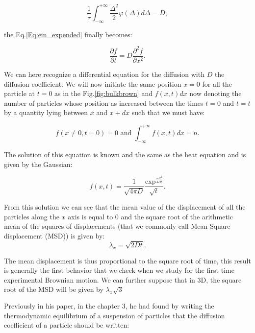\begin{equation}
	\frac{1}{\tau} \int_{-\infty}^{+\infty} \frac{\Delta^2}{2}\varphi(\Delta)d\Delta =D,
\end{equation}

the Eq.\ref{Eq:ein_expended} finally becomes:

\begin{equation}
	\frac{\partial f}{\partial t} = D \frac{\partial ^2 f}{\partial x ^2}.
\end{equation}


We can here recognize a differential equation for the diffusion with $D$ the diffusion coefficient. We will now initiate the same position $x=0$ for all the particle at $t=0$ as in the Fig.\ref{fig:bulkbrown} and $f(x,t)dx$ now denoting the number of particles whose position as increased between the times  $t=0$ and $t=t$  by a quantity lying between $x$ and $x + dx$ such that we must have:

\begin{equation}
	f(x \ne 0, t=0) = 0 \text{ and } \int_{-\infty}^{+\infty}f(x,t)dx = n.
\end{equation}

The solution of this equation is known and the same as the heat equation and is given by the Gaussian:


\begin{equation}
	f(x,t) = \frac{1}{\sqrt{4\pi D}} \frac{\mathrm{exp}^{\frac{-x^2}{4Dt}}}{\sqrt{t}}.
\end{equation}

From this solution we can see that the mean value of the displacement of all the particles along the $x$ axis is equal to $0$ and the square root of the arithmetic mean of the squares of displacements (that we commonly call Mean Square displacement (\gls{MSD}))  is given by:
\begin{equation}
	\lambda _x = \sqrt{2Dt}.
	\label{Eq:MSD_ein}
\end{equation}

The mean displacement is thus proportional to the square root of time, this result is generally the first behavior that we check when we study for the first time experimental Brownian motion. We can further suppose that in 3D, the square root of the \gls{MSD} will be given by $\lambda_x \sqrt{3}$

Previously in his paper, in the chapter 3, he had found by writing the thermodynamic equilibrium of a suspension of particles that the diffusion coefficient of a particle should be written:

